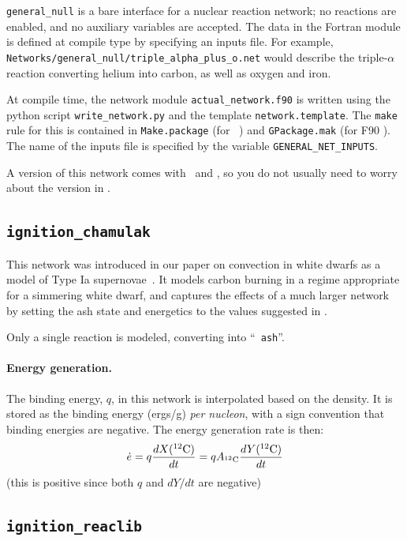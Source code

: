 {\tt general\_null} is a bare interface for a nuclear reaction
network; no reactions are enabled, and no auxiliary variables are
accepted.  The data in the Fortran module is defined at compile type
by specifying an inputs file.  For example, {\tt
  Networks/general\_null/triple\_alpha\_plus\_o.net} would describe
the triple-$\alpha$ reaction converting helium into carbon, as well as
oxygen and iron.

At compile time, the network module {\tt actual\_network.f90}
is written using the python script {\tt write\_network.py}
and the template {\tt network.template}.  The {\tt make} rule
for this is contained in {\tt Make.package} (for \cpp\ \boxlib) and
{\tt GPackage.mak} (for F90 \boxlib).  The name of the inputs file
is specified by the variable {\tt GENERAL\_NET\_INPUTS}.

A version of this network comes with \maestro\ and \castro, so you do
not usually need to worry about the version in \microphysics.


\subsection{{\tt ignition\_chamulak}}

This network was introduced in our paper on convection in white dwarfs
as a model of Type Ia supernovae~\cite{wdconvect}.  It models
carbon burning in a regime appropriate for a simmering white dwarf,
and captures the effects of a much larger network by setting the ash
state and energetics to the values suggested in \cite{chamulak:2008}.

Only a single reaction is modeled, converting  into ``{\tt
  ash}''.

\paragraph{Energy generation.} The binding energy, $q$, in this 
network is interpolated based on the density.  It is stored as the
binding energy (ergs/g) {\em per nucleon}, with a sign convention that
binding energies are negative.  The energy generation rate is then:
\begin{equation}
\edot = q \frac{dX(\isotm{C}{12})}{dt} = q A_{\isotm{C}{12}} \frac{dY(\isotm{C}{12})}{dt}
\end{equation}
(this is positive since both $q$ and $dY/dt$ are negative)

\subsection{{\tt ignition\_reaclib}}

